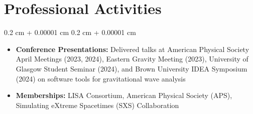 \documentclass[10pt, letterpaper]{article}
\newenvironment{highlightsforbulletentries}{
    \begin{itemize}[
        topsep=0.10 cm,
        parsep=0.10 cm,
        partopsep=0pt,
        itemsep=0pt,
        leftmargin=10pt
    ]
}{
    \end{itemize}
}
\newenvironment{onecolentry}{
    \begin{adjustwidth}{
        0.2 cm + 0.00001 cm
    }{
        0.2 cm + 0.00001 cm
    }
}{
    \end{adjustwidth}
}
\begin{document}
\section{Professional Activities}

\begin{onecolentry}
  \begin{highlightsforbulletentries}
    \item \textbf{Conference Presentations:} Delivered talks at American Physical Society April Meetings (2023, 2024), 
    Eastern Gravity Meeting (2023), University of Glasgow Student Seminar (2024), 
    and Brown University IDEA Symposium (2024) on software tools for gravitational wave analysis
        
    \item \textbf{Memberships:} LISA Consortium, American Physical Society (APS), 
    Simulating eXtreme Spacetimes (SXS) Collaboration
  \end{highlightsforbulletentries}
\end{onecolentry}
\end{document}
